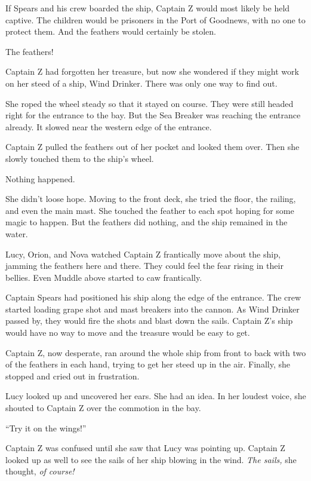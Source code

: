 \documentclass[12pt]{extbook}
\begin{document}
  If Spears and his crew boarded the ship, Captain Z would most likely be
  held captive. The children would be prisoners in the Port of Goodnews,
  with no one to protect them. And the feathers would certainly be stolen.
  
  The feathers!
  
  Captain Z had forgotten her treasure, but now she wondered if they might
  work on her steed of a ship, Wind Drinker. There was only one way to
  find out.
  
  She roped the wheel steady so that it stayed on course. They were still
  headed right for the entrance to the bay. But the Sea Breaker was
  reaching the entrance already. It slowed near the western edge of the
  entrance.
  
  Captain Z pulled the feathers out of her pocket and looked them over.
  Then she slowly touched them to the ship's wheel.
  
  Nothing happened.
  
  She didn't loose hope. Moving to the front deck, she tried the floor,
  the railing, and even the main mast. She touched the feather to each
  spot hoping for some magic to happen. But the feathers did nothing, and
  the ship remained in the water.
  
  Lucy, Orion, and Nova watched Captain Z frantically move about the ship,
  jamming the feathers here and there. They could feel the fear rising in
  their bellies. Even Muddle above started to caw frantically.
  
  Captain Spears had positioned his ship along the edge of the entrance.
  The crew started loading grape shot and mast breakers into the cannon.
  As Wind Drinker passed by, they would fire the shots and blast down the
  sails. Captain Z's ship would have no way to move and the treasure would
  be easy to get.
  
  Captain Z, now desperate, ran around the whole ship from front to back
  with two of the feathers in each hand, trying to get her steed up in the
  air. Finally, she stopped and cried out in frustration.
  
  Lucy looked up and uncovered her ears. She had an idea. In her loudest
  voice, she shouted to Captain Z over the commotion in the bay.
  
  \enquote{Try it on the wings!}
  
  Captain Z was confused until she saw that Lucy was pointing up. Captain
  Z looked up as well to see the sails of her ship blowing in the wind.
  \emph{The sails,} she thought, \emph{of course!}
  
\end{document}
